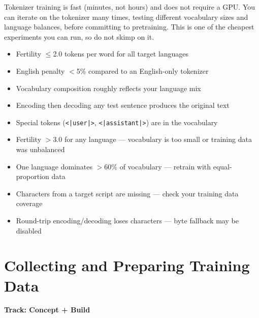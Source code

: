 \documentclass[11pt,a4paper]{article}
\begin{document}
\begin{tip}
Tokenizer training is fast (minutes, not hours) and does not require a GPU. You can iterate on the tokenizer many times, testing different vocabulary sizes and language balances, before committing to pretraining. This is one of the cheapest experiments you can run, so do not skimp on it.
\end{tip}

\begin{successcheck}
\begin{itemize}[nosep]
  \item Fertility $\leq$2.0 tokens per word for all target languages
  \item English penalty $<$5\% compared to an English-only tokenizer
  \item Vocabulary composition roughly reflects your language mix
  \item Encoding then decoding any test sentence produces the original text
  \item Special tokens (\texttt{<|user|>}, \texttt{<|assistant|>}) are in the vocabulary
\end{itemize}
\end{successcheck}

\begin{failuresign}
\begin{itemize}[nosep]
  \item Fertility $>$3.0 for any language --- vocabulary is too small or training data was unbalanced
  \item One language dominates $>$60\% of vocabulary --- retrain with equal-proportion data
  \item Characters from a target script are missing --- check your training data coverage
  \item Round-trip encoding/decoding loses characters --- byte fallback may be disabled
\end{itemize}
\end{failuresign}


\section{Collecting and Preparing Training Data}
\label{ch:data}

\begin{center}
\colorbox{lightaccent}{\textbf{Track: Concept + Build}}
\end{center}
\end{document}
